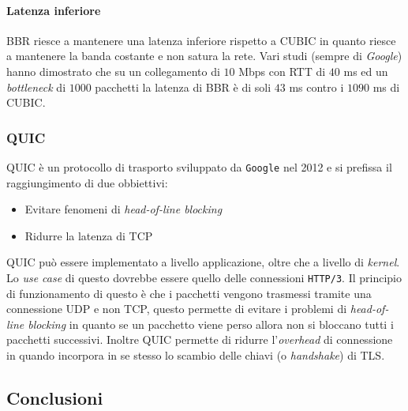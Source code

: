             \paragraph{Latenza inferiore} \Acrshort*{BBR} riesce a mantenere una latenza inferiore rispetto a \Acrshort*{CUBIC} in quanto riesce a mantenere la banda costante e non satura la rete. Vari studi (sempre di \textit{Google}) hanno dimostrato che su un collegamento di $10$ Mbps con \Acrshort*{RTT} di $40$ ms ed un \textit{bottleneck} di $1000$ pacchetti la latenza di \Acrshort*{BBR} è di soli $43$ ms contro i $1090$ ms di \Acrshort*{CUBIC}.
        \subsubsection{\Acrfull*{QUIC}}
            \Acrshort*{QUIC} è un protocollo di trasporto sviluppato da \texttt{Google} nel 2012 e si prefissa il raggiungimento di due obbiettivi:\begin{itemize}
                \item Evitare fenomeni di \textit{head-of-line blocking}
                \item Ridurre la latenza di \Acrshort*{TCP}
            \end{itemize}
            \Acrshort*{QUIC} può essere implementato a livello applicazione, oltre che a livello di \textit{kernel}. Lo \textit{use case} di questo dovrebbe essere quello delle connessioni \texttt{\Acrshort*{HTTP}/3}. Il principio di funzionamento di questo è che i pacchetti vengono trasmessi tramite una connessione \Acrshort*{UDP} e non \Acrshort*{TCP}, questo permette di evitare i problemi di \textit{head-of-line blocking} in quanto se un pacchetto viene perso allora non si bloccano tutti i pacchetti successivi. Inoltre \Acrshort*{QUIC} permette di ridurre l'\textit{overhead} di connessione in quando incorpora in se stesso lo scambio delle chiavi (o \textit{handshake}) di \Acrshort*{TLS}.
    \subsection{Conclusioni}
